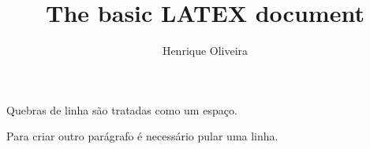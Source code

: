 \documentclass[12pt,twoside,a4paper]{article}
\author{Henrique Oliveira}
\title{The basic LATEX document}
\begin{document}
\maketitle
 Quebras
 de linha são
 tratadas como um espaço.
 
 Para criar outro parágrafo é necessário pular uma linha.
\end{document}
